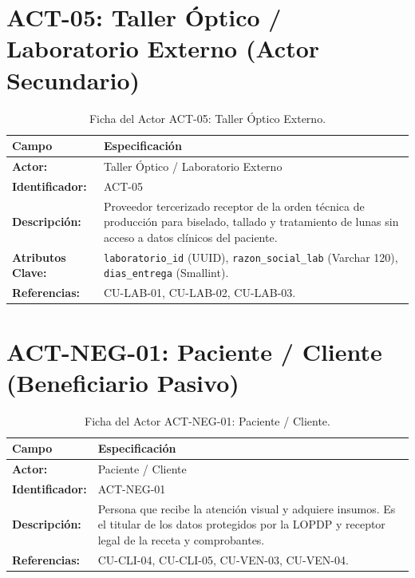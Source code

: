 \documentclass[12pt,a4paper]{report}
\begin{document}
\section{ACT-05: Taller Óptico / Laboratorio Externo (Actor Secundario)}
\begin{table}[H]
\centering
\small
\begin{tabularx}{\textwidth}{|L{3.5cm}|X|}
\hline
{}\color{white}\textbf{Campo} & \color{white}\textbf{Especificación} \\
\hline
\textbf{Actor:} & Taller Óptico / Laboratorio Externo \\
\hline
\textbf{Identificador:} & ACT-05 \\
\hline
\textbf{Descripción:} & Proveedor tercerizado receptor de la orden técnica de producción para biselado, tallado y tratamiento de lunas sin acceso a datos clínicos del paciente. \\
\hline
\textbf{Atributos Clave:} & \texttt{laboratorio\_id} (UUID), \texttt{razon\_social\_lab} (Varchar 120), \texttt{dias\_entrega} (Smallint). \\
\hline
\textbf{Referencias:} & CU-LAB-01, CU-LAB-02, CU-LAB-03. \\
\hline
\end{tabularx}
\caption{Ficha del Actor ACT-05: Taller Óptico Externo.}
\end{table}

\section{ACT-NEG-01: Paciente / Cliente (Beneficiario Pasivo)}
\begin{table}[H]
\centering
\small
\begin{tabularx}{\textwidth}{|L{3.5cm}|X|}
\hline
{}\color{white}\textbf{Campo} & \color{white}\textbf{Especificación} \\
\hline
\textbf{Actor:} & Paciente / Cliente \\
\hline
\textbf{Identificador:} & ACT-NEG-01 \\
\hline
\textbf{Descripción:} & Persona que recibe la atención visual y adquiere insumos. Es el titular de los datos protegidos por la LOPDP y receptor legal de la receta y comprobantes. \\
\hline
\textbf{Referencias:} & CU-CLI-04, CU-CLI-05, CU-VEN-03, CU-VEN-04. \\
\hline
\end{tabularx}
\caption{Ficha del Actor ACT-NEG-01: Paciente / Cliente.}
\end{table}
\end{document}
